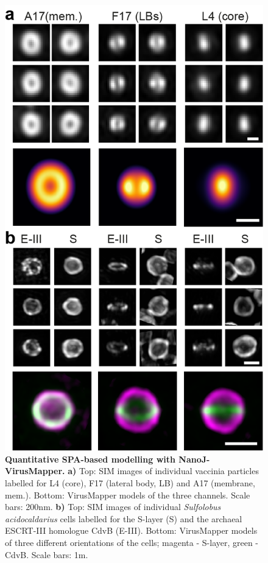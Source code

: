   \begin{figure}[!t]
    \centering
    \includegraphics{Figures/NanoJ_VirusMapperFigure_v3.png}
    \caption{\textbf{Quantitative SPA-based modelling with NanoJ-VirusMapper.} \textbf{a)} Top: SIM images of individual vaccinia particles labelled for L4 (core), F17 (lateral body, LB) and A17 (membrane, mem.). Bottom: VirusMapper models of the three channels. Scale bars: 200nm. \textbf{b)} Top: SIM images of individual \emph{Sulfolobus acidocaldarius} cells labelled for the S-layer (S) and the archaeal ESCRT-III homologue CdvB (E-III). Bottom: VirusMapper models of three different orientations of the cells; magenta - S-layer, green - CdvB. Scale bars: 1\micro m. }
    \label{fig:VirusMapper}
 \end{figure}

